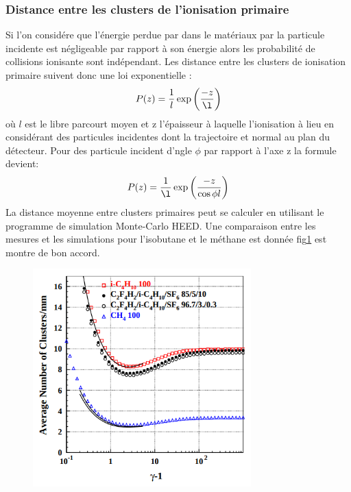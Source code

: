 \subsubsection*{Distance entre les clusters de l'ionisation primaire}
Si l'on considére que l'énergie perdue par dans le matériaux par la particule incidente est négligeable par rapport à son énergie alors les probabilité de collisions ionisante sont indépendant. Les distance entre les clusters de ionisation primaire suivent donc une loi exponentielle :
\begin{equation}
P(z)=\frac{1}{l}\exp\left(\frac{-z}{\l}\right)
\end{equation} 
où $l$ est le libre parcourt moyen et z l'épaisseur à laquelle l'ionisation à lieu en considérant des particules incidentes dont la trajectoire et normal au plan du détecteur. Pour des particule incident d'ngle $\phi$ par rapport à l'axe z la formule devient:
\begin{equation}
P(z)=\frac{1}{\l}\exp\left(\frac{-z}{\cos\phi l}\right)
\end{equation}
La distance moyenne entre clusters primaires peut se calculer en utilisant le programme de simulation Monte-Carlo HEED\cite{HEED}. Une comparaison entre les mesures et les simulations pour l'isobutane et le méthane est donnée fig\ref{lambda} est montre de bon accord\cite{2004NIMPA.518...86R}.  
\begin{figure}[h!]
	\centering
	\includegraphics[width=0.75\textwidth]{RPC/lambda.png}
	\label{lambda}
\end{figure}

